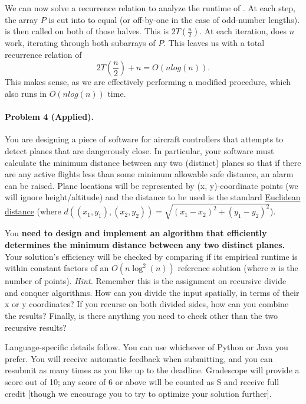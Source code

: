 \documentclass[11pt]{article}
\begin{document}
We can now solve a recurrence relation to analyze the runtime of 
. At each step, the array $P$ is cut into to equal (or
off-by-one in the case of odd-number lengths).  is then called
on both of those halves. This is $2T(\frac{n}{2})$. At each iteration,
 does $n$ work, iterating through both subarrays of $P$.
This leaves us with a total recurrence relation of
\[
2T\left(\frac{n}{2}\right) + n = O(nlog(n)).
\]
This makes sense, as we are effectively performing a modified 
procedure, which also runs in $O(nlog(n))$ time.


\newpage
\paragraph{Problem 4 (Applied).} You are designing a piece of software for aircraft controllers that attempts to detect planes that are dangerously close. In particular, your software must calculate the minimum distance between any two (distinct) planes so that if there are any active flights less than some minimum allowable safe distance, an alarm can be raised. Plane locations will be represented by (x, y)-coordinate points (we will ignore height/altitude) and the distance to be used is the standard \href{https://en.wikipedia.org/wiki/Euclidean_distance}{Euclidean distance} (where $d((x_1, y_1), (x_2, y_2)) = \sqrt{(x_1-x_2)^2 + (y_1-y_2)^2}$). 

You \textbf{need to design and implement an algorithm that efficiently determines the minimum distance between any two distinct planes.}  Your solution's efficiency will be checked by comparing if its empirical runtime is within constant factors of an $O(n \log^2(n))$ reference solution (where $n$ is the number of points). \textit{Hint.} Remember this is the assignment on recursive divide and conquer algorithms. How can you divide the input spatially, in terms of their x or y coordinates? If you recurse on both divided sides, how can you combine the results? Finally, is there anything you need to check other than the two recursive results? 

Language-specific details follow. You can use whichever of Python or Java you prefer. You will receive automatic feedback when submitting, and you can resubmit as many times as you like up to the deadline. Gradescope will provide a score out of 10; any score of 6 or above will be counted as S and receive full credit [though we encourage you to try to optimize your solution further].
\end{document}
